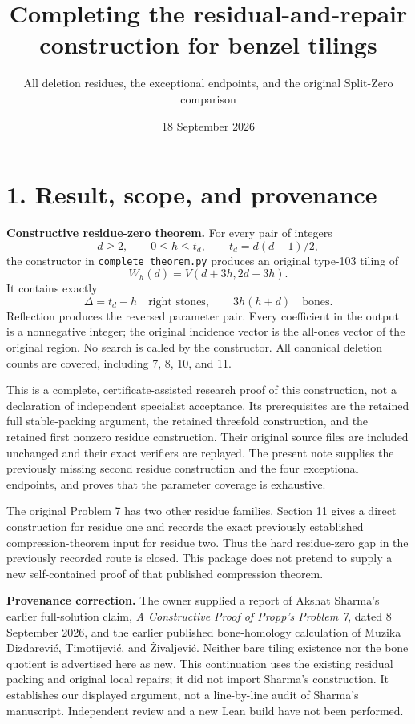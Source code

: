 \documentclass[
  11pt,
]{article}
\title{Completing the residual-and-repair construction for benzel
tilings}
\subtitle{All deletion residues, the exceptional endpoints, and the
original Split-Zero comparison}
\author{}
\date{18 September 2026}
\begin{document}
\maketitle

{
\hypersetup{linkcolor=}
\setcounter{tocdepth}{3}
\tableofcontents
}
\section{1. Result, scope, and
provenance}\label{result-scope-and-provenance}

\textbf{Constructive residue-zero theorem.} For every pair of integers
\[
 d\ge2,\qquad 0\le h\le t_d,\qquad t_d=d(d-1)/2,
\] the constructor in \texttt{complete\_theorem.py} produces an original
type-103 tiling of \[
 W_h(d)=V(d+3h,2d+3h).
\] It contains exactly \[
 \Delta=t_d-h\quad\text{right stones},\qquad 3h(h+d)\quad\text{bones}.
\] Reflection produces the reversed parameter pair. Every coefficient in
the output is a nonnegative integer; the original incidence vector is
the all-ones vector of the original region. No search is called by the
constructor. All canonical deletion counts are covered, including 7, 8,
10, and 11.

This is a complete, certificate-assisted research proof of this
construction, not a declaration of independent specialist acceptance.
Its prerequisites are the retained full stable-packing argument, the
retained threefold construction, and the retained first nonzero residue
construction. Their original source files are included unchanged and
their exact verifiers are replayed. The present note supplies the
previously missing second residue construction and the four exceptional
endpoints, and proves that the parameter coverage is exhaustive.

The original Problem 7 has two other residue families. Section 11 gives
a direct construction for residue one and records the exact previously
established compression-theorem input for residue two. Thus the hard
residue-zero gap in the previously recorded route is closed. This
package does not pretend to supply a new self-contained proof of that
published compression theorem.

\textbf{Provenance correction.} The owner supplied a report of Akshat
Sharma's earlier full-solution claim, \emph{A Constructive Proof of
Propp's Problem 7}, dated 8 September 2026, and the earlier published
bone-homology calculation of Muzika Dizdarević, Timotijević, and
Živaljević. Neither bare tiling existence nor the bone quotient is
advertised here as new. This continuation uses the existing residual
packing and original local repairs; it did not import Sharma's
construction. It establishes our displayed argument, not a line-by-line
audit of Sharma's manuscript. Independent review and a new Lean build
have not been performed.
\end{document}
